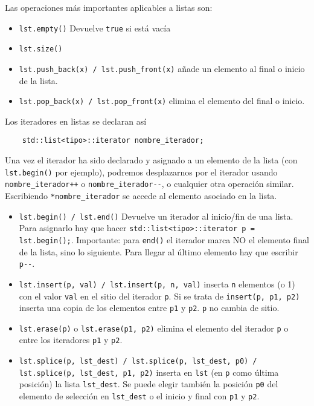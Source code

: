 \documentclass[a4paper]{article}
\begin{document}
	Las operaciones más importantes aplicables a listas son:
	\begin{itemize}
		\item \verb|lst.empty()| Devuelve \verb|true| si está vacía
		\item \verb|lst.size()|
		\item \verb|lst.push_back(x) / lst.push_front(x)| añade un elemento al final o inicio de la lista.
		\item \verb|lst.pop_back(x) / lst.pop_front(x)| elimina el elemento del final o inicio.
	\end{itemize}
	
	Los iteradores en listas se declaran así
	
	\begin{verbatim}
	std::list<tipo>::iterator nombre_iterador;
	\end{verbatim}
	
	Una vez el iterador ha sido declarado y asignado a un elemento de la lista (con \verb|lst.begin()| por ejemplo), podremos desplazarnos por el iterador usando \verb|nombre_iterador++| o \verb|nombre_iterador--|, o cualquier otra operación similar. Escribiendo \verb|*nombre_iterador| se accede al elemento asociado en la lista.
	
	\begin{itemize}
		\item \verb|lst.begin() / lst.end()| Devuelve un iterador al inicio/fin de una lista. Para asignarlo hay que hacer \verb|std::list<tipo>::iterator p = lst.begin();|. Importante: para \verb|end()| el iterador marca NO el elemento final de la lista, sino lo siguiente. Para llegar al último elemento hay que escribir \verb|p--|. 
		\item \verb|lst.insert(p, val) / lst.insert(p, n, val)| inserta \verb|n| elementos (o 1) con el valor \verb|val| en el sitio del iterador \verb|p|. Si se trata de \verb|insert(p, p1, p2)| inserta una copia de los elementos entre \verb|p1| y \verb|p2|. \verb|p| no cambia de sitio.
		\item \verb|lst.erase(p)| o \verb|lst.erase(p1, p2)| elimina el elemento del iterador \verb|p| o entre los iteradores \verb|p1| y \verb|p2|.
		\item \verb|lst.splice(p, lst_dest) / lst.splice(p, lst_dest, p0) / lst.splice(p, lst_dest, p1, p2)| inserta en \verb|lst| (en \verb|p| como última posición) la lista \verb|lst_dest|. Se puede elegir también la posición \verb|p0| del elemento de selección en \verb|lst_dest| o el inicio y final con \verb|p1| y \verb|p2|.																		
	\end{itemize} 
	
\end{document}
